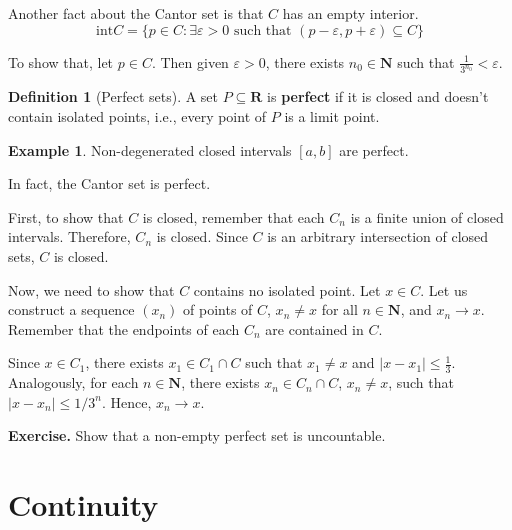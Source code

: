 \documentclass[12pt,a4paper]{article}
\theoremstyle{definition}
\newtheorem{example}{Example}[section]
\newtheorem{definition}{Definition}[section]
\begin{document}
Another fact about the Cantor set is that $C$ has an empty interior.
\[
	\text{int} C = \{ p \in C : \exists \varepsilon > 0 \text{ such that } (p-\varepsilon, p+\varepsilon) \subseteq C \}
\]

To show that, let $p \in C$. Then given $\varepsilon > 0$, there exists $n_0 \in \textbf{N}$ such that $\frac{1}{3^{n_0}} < \varepsilon$. 

\begin{definition}[Perfect sets]
	A set $P \subseteq \textbf{R}$ is \textbf{perfect} if it is closed and doesn't contain isolated points, i.e., every point of $P$ is a limit point.
\end{definition}

\begin{example}
	Non-degenerated closed intervals $[a,b]$ are perfect.
\end{example}

In fact, the Cantor set is perfect. 

First, to show that $C$ is closed, remember that each $C_n$ is a finite union of closed intervals. Therefore, $C_n$ is closed. Since $C$ is an arbitrary intersection of closed sets, $C$ is closed.

Now, we need to show that $C$ contains no isolated point. Let $x \in C$. Let us construct a sequence $(x_n)$ of points of $C$, $x_n \neq x$ for all $n \in \textbf{N}$, and $x_n \to x$. Remember that the endpoints of each $C_n$ are contained in $C$.

Since $x \in C_1$, there exists $x_1 \in C_1 \cap C$ such that $x_1 \neq x$ and $|x - x_1| \leq \frac{1}{3}$. Analogously, for each $n \in \textbf{N}$, there exists $x_n \in C_n \cap C$, $x_n \neq x$, such that $|x - x_n| \leq 1/3^n$. Hence, $x_n \to x$.

\textbf{Exercise.} Show that a non-empty perfect set is uncountable.

\newpage

\section{Continuity}

\newpage
\nocite{*}


\end{document}
